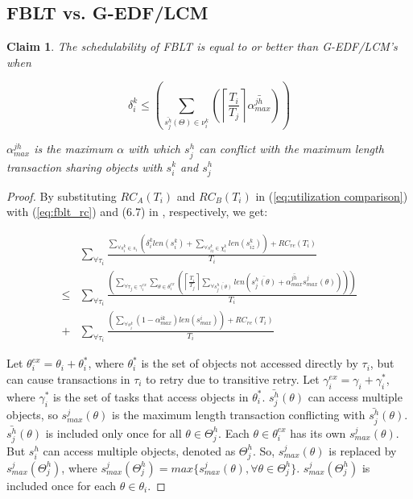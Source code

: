 \documentclass[conference]{IEEEtran}
\newtheorem{clm}{Claim}
\begin{document}
\subsection{FBLT vs. G-EDF/LCM}

\begin{clm}\label{clm:fblt_lcm_edf}
The schedulability of FBLT is equal to or better than G-EDF/LCM's when 

\[
\delta_i^k\le\left(\sum_{\bar{s_{j}^{h}}(\Theta)\in\nu_{i}^{k}}\left(\left\lceil \frac{T_{i}}{T_{j}}\right\rceil \bar{\alpha_{max}^{jh}}\right)\right)
\]

$\alpha_{max}^{jh}$ is the maximum $\alpha$ with which $s_{j}^{h}$ can conflict with the maximum length transaction sharing objects with $s_{i}^{k}$ and $s_{j}^{h}$
\end{clm}
%
\begin{proof}

By substituting $RC_{A}(T_{i})$ and $RC_{B}(T_{i})$ in (\ref{eq:utilization comparison})
with (\ref{eq:fblt_rc}) and (6.7) in \cite{shambake_phd_proposal}, respectively, we get:

\begin{eqnarray}
 & \sum_{\forall\tau_{i}}\frac{\sum_{\forall s_{i}^{k}\in s_{i}}\left(\delta_i^klen(s_{i}^{k})+\sum_{\forall s_{iz}^{k}\in\chi_{i}^{k}}len(s_{iz}^{k})\right)+RC_{re}(T_{i})}{T_{i}}\label{eq:fblt_lcm_edf_comparison_1}\\
\le & \sum_{\forall\tau_{i}}\frac{\left(\sum_{\forall\tau_{j}\in\gamma_{i}^{ex}}\sum_{\theta\in\theta_{i}^{ex}}\left(\left\lceil \frac{T_{i}}{T_{j}}\right\rceil \sum_{\forall\bar{s_{j}^{h}(\theta)}}len\left(\bar{s_{j}^{h}(\theta)}+\bar{\alpha_{max}^{jh}}s_{max}^{j}(\theta)\right)\right)\right)}{T_{i}}\nonumber \\
+ & \sum_{\forall\tau_{i}}\frac{\left(\sum_{\forall s_{i}^{k}}\left(1-\alpha_{max}^{ik}\right)len\left(s_{max}^{i}\right)\right)+RC_{re}(T_{i})}{T_{i}}\nonumber 
\end{eqnarray}

%
Let $\theta_{i}^{ex}=\theta_{i}+\theta_{i}^{*}$, where $\theta_{i}^{*}$
is the set of objects not accessed directly by $\tau_{i}$, but can
cause transactions in $\tau_{i}$ to retry due to transitive retry.
Let $\gamma_{i}^{ex}=\gamma_{i}+\gamma_{i}^{*}$, where $\gamma_{i}^{*}$
is the set of tasks that access objects in $\theta_{i}^{*}$. $\bar{s_{j}^{h}}(\theta)$
can access multiple objects, so $s_{max}^{j}(\theta)$ is the maximum
length transaction conflicting with $\bar{s_{j}^{h}}(\theta)$. $\bar{s_{j}^{h}}(\theta)$ is included only once for all $\theta \in \Theta_j^h$. Each $\theta \in \theta_i^{ex}$ has its own $s_{max}^j(\theta)$. But $s_i^h$ can access multiple objects, denoted as $\Theta_j^h$. So, $s_{max}^j(\theta)$ is replaced by $s_{max}^j(\Theta_j^h)$, where $s_{max}^j(\Theta_j^h)=max\{s_{max}^j(\theta),\forall \theta \in \Theta_j^h\}$. 
 $s_{max}^j(\Theta_j^h)$ is included once for each $\theta \in \theta_i$. 
 

\end{proof}
\end{document}
